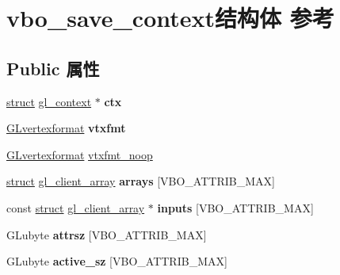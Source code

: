 \hypertarget{structvbo__save__context}{}\section{vbo\+\_\+save\+\_\+context结构体 参考}
\label{structvbo__save__context}
\subsection*{Public 属性}
\begin{DoxyCompactItemize}
\item 
\mbox{\label{structvbo__save__context_a6def6bbf2ec78c8ce62b951d94321a6c}} 
\hyperlink{interfacestruct}{struct} \hyperlink{structgl__context}{gl\+\_\+context} $\ast$ {\bfseries ctx}
\item 
\mbox{\label{structvbo__save__context_aba9642673443b3d6a0a23b169dcd7e41}} 
\hyperlink{struct_g_lvertexformat}{G\+Lvertexformat} {\bfseries vtxfmt}
\item 
\hyperlink{struct_g_lvertexformat}{G\+Lvertexformat} \hyperlink{structvbo__save__context_a70fb11090704a281aa91f0ddec9b86e2}{vtxfmt\+\_\+noop}
\item 
\mbox{\label{structvbo__save__context_afafd170471a891c2e5bdd24706ff5ffc}} 
\hyperlink{interfacestruct}{struct} \hyperlink{structgl__client__array}{gl\+\_\+client\+\_\+array} {\bfseries arrays} \mbox{[}V\+B\+O\+\_\+\+A\+T\+T\+R\+I\+B\+\_\+\+M\+AX\mbox{]}
\item 
\mbox{\label{structvbo__save__context_a79978062f6711e30eb1e3a77683de088}} 
const \hyperlink{interfacestruct}{struct} \hyperlink{structgl__client__array}{gl\+\_\+client\+\_\+array} $\ast$ {\bfseries inputs} \mbox{[}V\+B\+O\+\_\+\+A\+T\+T\+R\+I\+B\+\_\+\+M\+AX\mbox{]}
\item 
\mbox{\label{structvbo__save__context_a91b0c107bb6e611af8f84d354de93ec3}} 
G\+Lubyte {\bfseries attrsz} \mbox{[}V\+B\+O\+\_\+\+A\+T\+T\+R\+I\+B\+\_\+\+M\+AX\mbox{]}
\item 
\mbox{\label{structvbo__save__context_a5c3da50f14e05759e6e4d44614ff6dc1}} 
G\+Lubyte {\bfseries active\+\_\+sz} \mbox{[}V\+B\+O\+\_\+\+A\+T\+T\+R\+I\+B\+\_\+\+M\+AX\mbox{]}

\end{DoxyCompactItemize}
